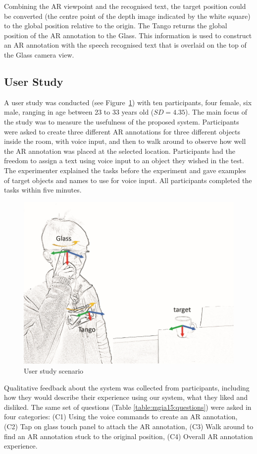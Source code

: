 Combining the AR viewpoint and the recognised text, the target position could be converted (the centre point of the depth image indicated by the white square) to the global position relative to the origin. The Tango returns the global position of the AR annotation to the Glass. This information is used to construct an AR annotation with the speech recognised text that is overlaid on the top of the Glass camera view.

\subsection{User Study}

A user study was conducted (see Figure~\ref{fig:mgia15:scenario}) with ten participants, four female, six male, ranging in age between 23 to 33 years old ($SD= 4.35$). The main focus of the study was to measure the usefulness of the proposed system. Participants were asked to create three different AR annotations for three different objects inside the room, with voice input, and then to walk around to observe how well the AR annotation was placed at the selected location. Participants had the freedom to assign a text using voice input to an object they wished in the test. The experimenter explained the tasks before the experiment and gave examples of target objects and names to use for voice input. All participants completed the tasks within five minutes. 

\begin{figure}
  \centering
  \includegraphics[width=0.6\linewidth]{images/62-3d-mgia15/axis_lo_small.jpg}
  \caption{User study scenario}
  \label{fig:mgia15:scenario}
\end{figure}

Qualitative feedback about the system was collected from participants, including how they would describe their experience using our system, what they liked and disliked. The same set of questions (Table \ref{table:mgia15:questions}) were asked in four categories: (C1) Using the voice commands to create an AR annotation, (C2) Tap on glass touch panel to attach the AR annotation, (C3)  Walk around to find an AR annotation stuck to the original position, (C4) Overall AR annotation experience.

